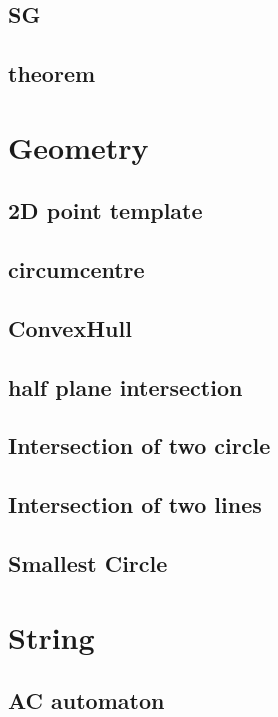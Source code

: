	\subsection{SG}
		
	\subsection{theorem}
		

\section{Geometry}
	\subsection{2D point template}
		
	\subsection{circumcentre}
		
	\subsection{ConvexHull}
		
	\subsection{half plane intersection}
		
	\subsection{Intersection of two circle}
		
	\subsection{Intersection of two lines}
		
	\subsection{Smallest Circle}
		

\section{String}
	\subsection{AC automaton}
		
